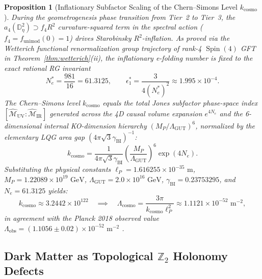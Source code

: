 \documentclass[11pt,a4paper]{article}
\theoremstyle{plain}
\newtheorem{proposition}[theorem]{Proposition}
\theoremstyle{definition}
\theoremstyle{remark}
\newcommand{\Spin}{\operatorname{Spin}}
\newcommand{\M}{\mathcal{M}}
\newcommand{\Z}{\mathbb{Z}}
\newcommand{\Dbb}{\mathbb{D}}
\begin{document}
\begin{proposition}[Inflationary Subfactor Scaling of the Chern--Simons Level $k_{\mathrm{cosmo}}$]
\label{prop:lambda_scaling}
During the geometrogenesis phase transition from Tier~2 to Tier~3, the $a_4(\Dbb_\eta^2) \supset f_4 R^2$ curvature-squared term in the spectral action ($f_4 = f_{\mathrm{unimod}}(0) = 1$) drives Starobinsky $R^2$-inflation. As proved via the Wetterich functional renormalization group trajectory of rank-4 $\Spin(4)$ GFT in Theorem~\ref{thm:wetterich}(ii), the inflationary e-folding number is fixed to the exact rational RG invariant
\begin{equation}
  N_e^* = \frac{981}{16} = 61.3125, \qquad \epsilon_1^* = \frac{3}{4 (N_e^*)^2} \approx 1.995 \times 10^{-4}.
\end{equation}
The Chern--Simons level $k_{\mathrm{cosmo}}$ equals the total Jones subfactor phase-space index $[\widehat{\M}_{\mathrm{UV}} : \widehat{\M}_{\mathrm{IR}}]$ generated across the 4D causal volume expansion $e^{4 N_e}$ and the 6-dimensional internal KO-dimension hierarchy $(M_P / \Lambda_{\mathrm{GUT}})^6$, normalized by the elementary LQG area gap $(4\pi\sqrt{3}\gamma_{\mathrm{BI}})^{-1}$:
\begin{equation}
  \label{eq:k_cosmo_formula}
  k_{\mathrm{cosmo}} = \frac{1}{4\pi\sqrt{3}\gamma_{\mathrm{BI}}} \left( \frac{M_P}{\Lambda_{\mathrm{GUT}}} \right)^6 \exp(4 N_e).
\end{equation}
Substituting the physical constants $\ell_P = 1.616255 \times 10^{-35}\text{ m}$, $M_P = 1.22089 \times 10^{19}\text{ GeV}$, $\Lambda_{\mathrm{GUT}} = 2.0 \times 10^{16}\text{ GeV}$, $\gamma_{\mathrm{BI}} = 0.23753295$, and $N_e = 61.3125$ yields:
\begin{equation}
  k_{\mathrm{cosmo}} \approx 3.2442 \times 10^{122} \quad \implies \quad \Lambda_{\mathrm{cosmo}} = \frac{3\pi}{k_{\mathrm{cosmo}} \ell_P^2} \approx 1.1121 \times 10^{-52}\text{ m}^{-2},
\end{equation}
in agreement with the Planck 2018 observed value $\Lambda_{\mathrm{obs}} = (1.1056 \pm 0.02) \times 10^{-52}\text{ m}^{-2}$ \cite{Planck2018}.
\end{proposition}

\subsection{Dark Matter as Topological $\Z_2$ Holonomy Defects}
\end{document}
